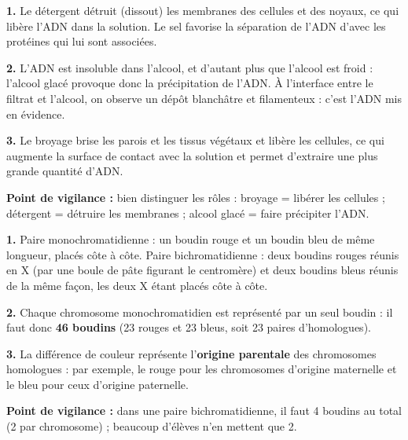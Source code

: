 \documentclass[11pt]{article}
\begin{document}
\begin{corrige}
\textbf{1.} Le détergent détruit (dissout) les membranes des cellules et des noyaux, ce qui libère l'ADN dans la solution. Le sel favorise la séparation de l'ADN d'avec les protéines qui lui sont associées.

\textbf{2.} L'ADN est insoluble dans l'alcool, et d'autant plus que l'alcool est froid : l'alcool glacé provoque donc la précipitation de l'ADN. À l'interface entre le filtrat et l'alcool, on observe un dépôt blanchâtre et filamenteux : c'est l'ADN mis en évidence.

\textbf{3.} Le broyage brise les parois et les tissus végétaux et libère les cellules, ce qui augmente la surface de contact avec la solution et permet d'extraire une plus grande quantité d'ADN.

\textbf{Point de vigilance :} bien distinguer les rôles : broyage = libérer les cellules ; détergent = détruire les membranes ; alcool glacé = faire précipiter l'ADN.
\end{corrige}

\begin{corrige}
\textbf{1.} Paire monochromatidienne : un boudin rouge et un boudin bleu de même longueur, placés côte à côte. Paire bichromatidienne : deux boudins rouges réunis en X (par une boule de pâte figurant le centromère) et deux boudins bleus réunis de la même façon, les deux X étant placés côte à côte.

\textbf{2.} Chaque chromosome monochromatidien est représenté par un seul boudin : il faut donc \textbf{46 boudins} (23 rouges et 23 bleus, soit 23 paires d'homologues).

\textbf{3.} La différence de couleur représente l'\textbf{origine parentale} des chromosomes homologues : par exemple, le rouge pour les chromosomes d'origine maternelle et le bleu pour ceux d'origine paternelle.

\textbf{Point de vigilance :} dans une paire bichromatidienne, il faut 4 boudins au total (2 par chromosome) ; beaucoup d'élèves n'en mettent que 2.
\end{corrige}
\end{document}
